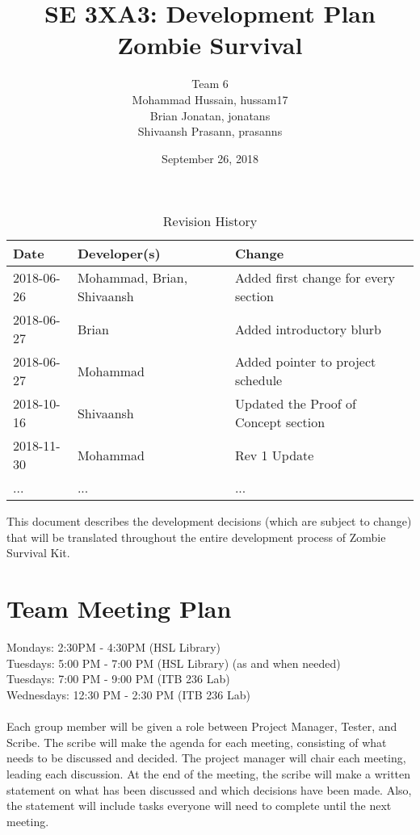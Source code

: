\documentclass{article}
\title{SE 3XA3: Development Plan\\Zombie Survival}
\author{Team 6
		\\ Mohammad Hussain, hussam17
		\\ Brian Jonatan,  jonatans
		\\ Shivaansh Prasann, prasanns
}
\date{September 26, 2018}
\begin{document}
\begin{table}[hp]
\caption{Revision History} \label{TblRevisionHistory}
\begin{tabularx}{\textwidth}{llX}
\toprule
\textbf{Date} & \textbf{Developer(s)} & \textbf{Change}\\
\midrule
2018-06-26 & Mohammad, Brian, Shivaansh & Added first change for every section\\
2018-06-27 & Brian & Added introductory blurb\\
2018-06-27 & Mohammad & Added pointer to project schedule\\
2018-10-16 & Shivaansh & Updated the Proof of Concept section\\
2018-11-30 & Mohammad & Rev 1 Update\\
... & ... & ...\\
\bottomrule
\end{tabularx}
\end{table}

\newpage

\maketitle

This document describes the development decisions (which are subject to change) that will be translated throughout the entire development process of Zombie Survival Kit.

\section{Team Meeting Plan}
Mondays: 2:30PM - 4:30PM (HSL Library)\\
Tuesdays: 5:00 PM - 7:00 PM (HSL Library) (as and when needed)\\
Tuesdays: 7:00 PM - 9:00 PM (ITB 236 Lab)\\
Wednesdays: 12:30 PM - 2:30 PM (ITB 236 Lab) \\ \\
{\color{magenta} Each group member will be given a role between Project Manager, Tester, and Scribe. The scribe will make the agenda for 
each meeting, consisting of what needs to be discussed and decided. The project manager will chair each meeting, leading each discussion. At the
end of the meeting, the scribe will make a written statement on what has been discussed and which decisions have been made. Also, the statement
will include tasks everyone will need to complete until the next meeting.}
\end{document}
